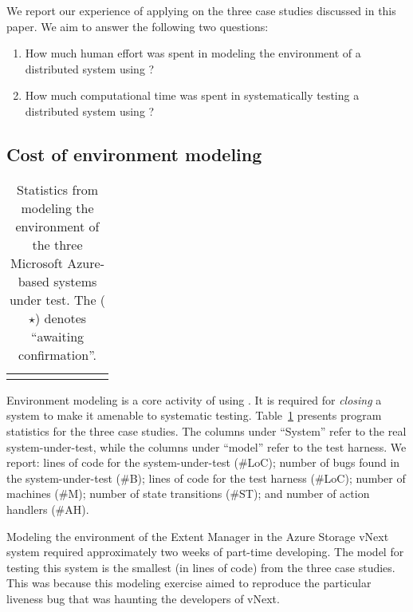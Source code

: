 We report our experience of applying \psharp on the three case studies discussed in this paper. We aim to answer the following two questions:

\begin{enumerate}
\item How much human effort was spent in modeling the environment of a distributed system using \psharp?

\item How much computational time was spent in systematically testing a distributed system using \psharp?
\end{enumerate}

\subsection{Cost of environment modeling}
\label{sec:eval:human_cost}

\newcommand{\colspacing}{\hspace{1.8em}}
\begin{table}[t]
\small
\centering
\setlength{\tabcolsep}{0.3em}
\begin{tabular}{l rrrrr rr}
\centering

\end{tabular}
\caption{Statistics from modeling the environment of the three Microsoft Azure-based systems under test. The ($\star$) denotes ``awaiting confirmation''.}
\label{tab:stats}
\end{table}

Environment modeling is a core activity of using \psharp. It is required for \emph{closing} a system to make it amenable to systematic testing. Table~\ref{tab:stats} presents program statistics for the three case studies. The columns under ``System'' refer to the real system-under-test, while the columns under ``\psharp model'' refer to the \psharp test harness. We report: lines of code for the system-under-test (\#LoC); number of bugs found in the system-under-test (\#B); lines of \psharp code for the test harness (\#LoC); number of machines (\#M); number of state transitions (\#ST); and number of action handlers (\#AH).

Modeling the environment of the Extent Manager in the Azure Storage vNext system required approximately two weeks of part-time developing. The \psharp model for testing this system is the smallest (in lines of code) from the three case studies. This was because this modeling exercise aimed to reproduce the particular liveness bug that was haunting the developers of vNext.

